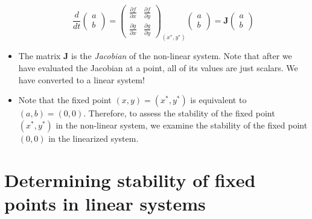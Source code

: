 \documentclass{article}
\begin{document}
\begin{itemize}
\[ \frac{d}{dt} \begin{pmatrix} a \\ b \end{pmatrix} =  \begin{pmatrix} \frac{\partial f}{\partial x}  & \frac{\partial f}{\partial y}  \\ \frac{\partial g}{\partial x}  & \frac{\partial g}{\partial y}  \end{pmatrix}_{(x^*,y^*)} \begin{pmatrix} a \\ b \end{pmatrix} = \mathbf{J} \begin{pmatrix} a \\ b \end{pmatrix} \]

\item The matrix $\mathbf{J}$ is the \textit{Jacobian} of the non-linear system. Note that after we have evaluated the Jacobian at a point, all of its values are just scalars. We have converted to a linear system!

\item Note that the fixed point $(x,y)=(x^*,y^*)$ is equivalent to $(a,b)=(0,0)$. Therefore, to assess the stability of the fixed point $(x^*,y^*)$ in the non-linear system, we examine the stability of the fixed point $(0,0)$ in the linearized system.

\end{itemize}

\section*{Determining stability of fixed points in linear systems}
\end{document}
